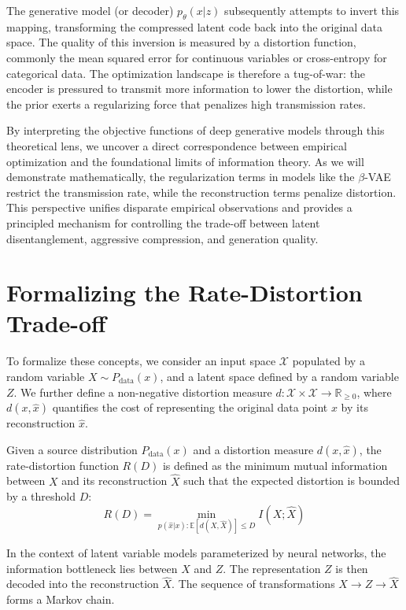 The generative model (or decoder) $p_\theta(x|z)$ subsequently attempts to invert this mapping, transforming the compressed latent code back into the original data space. The quality of this inversion is measured by a distortion function, commonly the mean squared error for continuous variables or cross-entropy for categorical data. The optimization landscape is therefore a tug-of-war: the encoder is pressured to transmit more information to lower the distortion, while the prior exerts a regularizing force that penalizes high transmission rates.

By interpreting the objective functions of deep generative models through this theoretical lens, we uncover a direct correspondence between empirical optimization and the foundational limits of information theory. As we will demonstrate mathematically, the regularization terms in models like the $\beta$-VAE restrict the transmission rate, while the reconstruction terms penalize distortion. This perspective unifies disparate empirical observations and provides a principled mechanism for controlling the trade-off between latent disentanglement, aggressive compression, and generation quality.

\section{Formalizing the Rate-Distortion Trade-off}

To formalize these concepts, we consider an input space $\mathcal{X}$ populated by a random variable $X \sim P_{\text{data}}(x)$, and a latent space defined by a random variable $Z$. We further define a non-negative distortion measure $d: \mathcal{X} \times \mathcal{X} \to \mathbb{R}_{\ge 0}$, where $d(x, \hat{x})$ quantifies the cost of representing the original data point $x$ by its reconstruction $\hat{x}$.

\begin{definition}
Given a source distribution $P_{\text{data}}(x)$ and a distortion measure $d(x, \hat{x})$, the rate-distortion function $R(D)$ is defined as the minimum mutual information between $X$ and its reconstruction $\hat{X}$ such that the expected distortion is bounded by a threshold $D$:
\begin{equation}
    R(D) = \min_{p(\hat{x}|x) : \mathbb{E}[d(X, \hat{X})] \le D} I(X; \hat{X})
\end{equation}
\end{definition}

In the context of latent variable models parameterized by neural networks, the information bottleneck lies between $X$ and $Z$. The representation $Z$ is then decoded into the reconstruction $\hat{X}$. The sequence of transformations $X \to Z \to \hat{X}$ forms a Markov chain.

